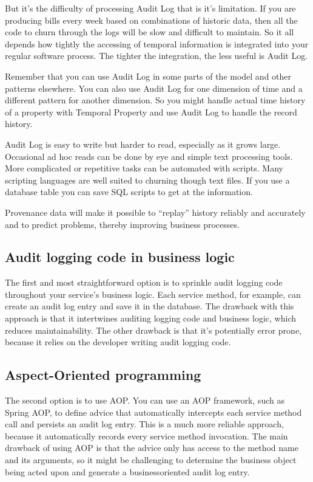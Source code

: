 But it's the difficulty of processing Audit Log that is it's limitation. If you are producing bills every week based on combinations of historic data, then all the code to churn through the logs will be slow and difficult to maintain. So it all depends how tightly the accessing of temporal information is integrated into your regular software process. The tighter the integration, the less useful is Audit Log.

Remember that you can use Audit Log in some parts of the model and other patterns elsewhere. You can also use Audit Log for one dimension of time and a different pattern for another dimension. So you might handle actual time history of a property with Temporal Property and use Audit Log to handle the record history.

Audit Log is easy to write but harder to read, especially as it grows large. Occasional ad hoc reads can be done by eye and simple text processing tools. More complicated or repetitive tasks can be automated with scripts. Many scripting languages are well suited to churning though text files. If you use a database table you can save SQL scripts to get at the information.

Provenance data will make it possible to “replay” history reliably and accurately and to predict problems, thereby improving business processes.

\subsection{Audit logging code in business logic}

The first and most straightforward option is to sprinkle audit logging code throughout your service’s business logic. Each service method, for example, can create an
audit log entry and save it in the database. The drawback with this approach is that it
intertwines auditing logging code and business logic, which reduces maintainability.
The other drawback is that it’s potentially error prone, because it relies on the developer writing audit logging code.

\subsection{Aspect-Oriented programming}

The second option is to use AOP. You can use an AOP framework, such as Spring
AOP, to define advice that automatically intercepts each service method call and persists an audit log entry. This is a much more reliable approach, because it automatically records every service method invocation. The main drawback of using AOP is
that the advice only has access to the method name and its arguments, so it might be
challenging to determine the business object being acted upon and generate a businessoriented audit log entry.

